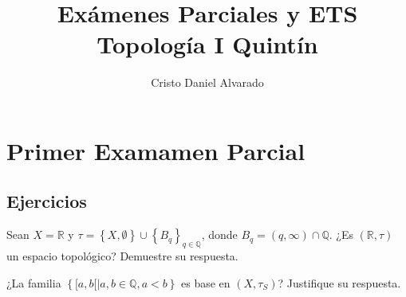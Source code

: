 \documentclass[12pt]{report}
\theoremstyle{largebreak}
\begin{document}
    \setlength{\parskip}{5pt} %
    \setlength{\parindent}{12pt} %
    \title{Exámenes Parciales y ETS Topología I Quintín}
    \author{Cristo Daniel Alvarado}
    \maketitle

    \tableofcontents %


    \chapter{Primer Examamen Parcial}

    \section{Ejercicios}

    \begin{excer}
        Sean $X=\mathbb{R}$ y $\tau=\left\{X,\emptyset \right\}\cup\left\{B_q\right\}_{q\in\mathbb{Q}}$, donde $B_q=(q,\infty)\cap\mathbb{Q}$. ¿Es $(\mathbb{R},\tau)$ un espacio topológico? Demuestre su respuesta.
    \end{excer}

    \begin{sol}
        
    \end{sol}

    \begin{excer}
        ¿La familia $\left\{[a,b[\big| a,b\in\mathbb{Q}, a<b \right\}$ es base en $(X,\tau_S)$? Justifique su respuesta.
    \end{excer}

    \begin{sol}
        
    \end{sol}
\end{document}
